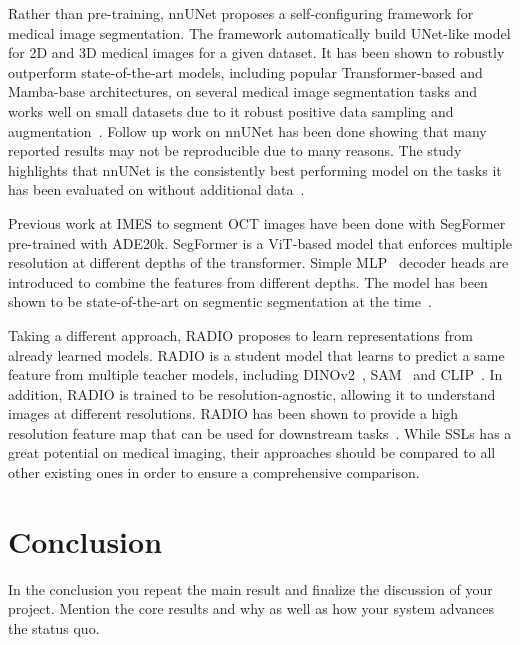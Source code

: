 \documentclass[a4paper,11pt,oneside]{report}
\begin{document}
Rather than pre-training, nnUNet proposes a self-configuring framework for medical image segmentation. The framework automatically build UNet-like model for 2D and 3D medical images for a given dataset. It has been shown to robustly outperform state-of-the-art models, including popular Transformer-based and Mamba-base architectures, on several medical image segmentation tasks and works well on small datasets due to it robust positive data sampling and augmentation~\cite{Isensee2020}. Follow up work on nnUNet has been done showing that many reported results may not be reproducible due to many reasons. The study highlights that nnUNet is the consistently best performing model on the tasks it has been evaluated on without additional data~\cite{Isensee2024}.

Previous work at IMES to segment OCT images have been done with SegFormer pre-trained with ADE20k. SegFormer is a ViT-based model that enforces multiple resolution at different depths of the transformer. Simple MLP~\cite{Rumelhart1986} decoder heads are introduced to combine the features from different depths. The model has been shown to be state-of-the-art on segmentic segmentation at the time~\cite{Xie2021SegFormer}.

Taking a different approach, RADIO proposes to learn representations from already learned models. RADIO is a student model that learns to predict a same feature from multiple teacher models, including DINOv2~\cite{Oquab2024dinov}, SAM~\cite{Kirillov2023SAM} and CLIP~\cite{Radford2021CLIP}. In addition, RADIO is trained to be resolution-agnostic, allowing it to understand images at different resolutions. RADIO has been shown to provide a high resolution feature map that can be used for downstream tasks~\cite{Ranzinger2024RADIO}. While SSLs has a great potential on medical imaging, their approaches should be compared to all other existing ones in order to ensure a comprehensive comparison.

\chapter{Conclusion}

In the conclusion you repeat the main result and finalize the discussion of
your project. Mention the core results and why as well as how your system
advances the status quo.

\cleardoublepage
{}
{}
\printbibliography

%
%
\end{document}
